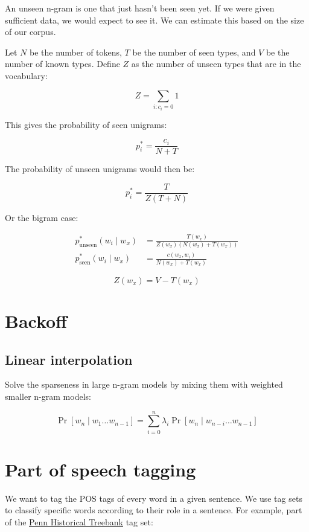 \documentclass{idc_msc}
\begin{document}
An unseen n-gram is one that just hasn't been seen yet.
If we were given sufficient data, we would expect to see it.
We can estimate this based on the size of our corpus.

Let \(N\) be the number of tokens, \(T\) be the number of seen types, and \(V\) be the number of known types.
Define \(Z\) as the number of unseen types that are in the vocabulary:

\[
  Z = \sum_{i : c_i = 0} 1
\]

This gives the probability of seen unigrams:

\[
  p_i^* = \frac{c_i}{N+T}
\]

The probability of unseen unigrams would then be:

\[
  p_i^* = \frac{T}{Z(T + N)}
\]

Or the bigram case:

\[
\begin{aligned}
  p^*_{\text{unseen}}(w_i \mid w_x) &= \frac{T(w_x)}{Z(w_x)(N(w_x) + T(w_x))} \\
  p^*_{\text{seen}}(w_i \mid w_x) &= \frac{c(w_x, w_i)}{N(w_x) + T(w_x)}
\end{aligned}
\]

\[
  Z(w_x) = V - T(w_x)
\]

\section{Backoff}

\subsection{Linear interpolation}

Solve the sparseness in large n-gram models by mixing them with weighted smaller n-gram models:

\[
  \Pr[w_n \mid w_1 \ldots w_{n-1}] = \sum_{i=0}^n \lambda_i \Pr[w_n \mid w_{n-i}\ldots w_{n-1}]
\]

\section{Part of speech tagging}

We want to tag the POS tags of every word in a given sentence.
We use tag sets to classify specific words according to their role in a sentence.
For example, part of the \href{http://www.ling.upenn.edu/histcorpora}{Penn Historical Treebank} tag set:
\end{document}
